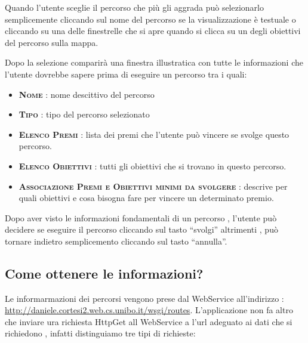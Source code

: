 Quando l'utente sceglie il percorso che più gli aggrada può selezionarlo semplicemente cliccando sul nome del percorso se la visualizzazione è testuale o cliccando su una delle finestrelle che si apre quando si clicca su un degli obiettivi del percorso sulla mappa.

Dopo la selezione comparirà una finestra illustratica con tutte le informazioni che l'utente dovrebbe sapere prima di 
eseguire un percorso tra i quali:

\begin{itemize}  

\item \textsc{\bfseries Nome} : nome descittivo del percorso\\
\item \textsc{\bfseries Tipo} : tipo del percorso selezionato\\
\item \textsc{\bfseries Elenco Premi} : lista dei premi che l'utente può vincere se svolge questo percorso.\\
\item \textsc{\bfseries Elenco Obiettivi} : tutti gli obiettivi che si trovano in questo percorso.\\
\item \textsc{\bfseries Associazione Premi e Obiettivi minimi da svolgere} : descrive per quali obiettivi e cosa bisogna fare per vincere un determinato premio.\\

\end{itemize}

Dopo aver visto le informazioni fondamentali di un percorso , l'utente può decidere se eseguire il percorso cliccando sul tasto “svolgi” altrimenti , può tornare indietro semplicemento cliccando sul tasto “annulla”.

\subsection{Come ottenere le informazioni?}
\vspace{2em}
Le informarmazioni dei percorsi vengono prese dal WebService all'indirizzo : \url{http://daniele.cortesi2.web.cs.unibo.it/wsgi/routes}.
L'applicazione non fa altro che inviare ura richiesta HttpGet all WebService a l'url adeguato ai dati che si richiedono , infatti distinguiamo tre tipi di richieste:

